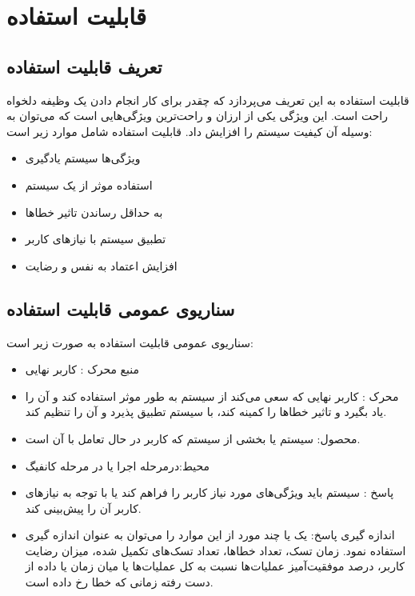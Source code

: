 \chapter{قابلیت استفاده}
\section{تعریف قابلیت استفاده}
قابلیت استفاده
به این تعریف می‌پردازد که چقدر برای کار انجام دادن یک وظیفه دلخواه راحت است. این ویژگی یکی از ارزان و راحت‌ترین ویژگی‌هایی است که می‌توان به وسیله آن کیفیت سیستم را افزایش داد. 
قابلیت استفاده شامل موارد زیر است:
\begin{itemize}
\item
ویژگی‌ها سیستم یادگیری
\item
استفاده موثر از یک سیستم 
\item
به حداقل رساندن تاثیر خطاها
\item
تطبیق سیستم با نیازهای کاربر
\item
افزایش اعتماد به نفس و رضایت
\end{itemize}


\section{سناریوی عمومی قابلیت استفاده}
سناریو‌ی عمومی قابلیت استفاده به صورت زیر است:
\begin{itemize}
\item
منبع محرک : کاربر نهایی
\item
محرک : کاربر نهایی که سعی می‌کند از سیستم به طور موثر استفاده کند و آن را یاد بگیرد و تاثیر خطاها را کمینه کند، با سیستم تطبیق پذیرد و آن را تنظیم کند.
\item
محصول: سیستم یا بخشی از سیستم که کاربر در حال تعامل با آن است.
\item
محیط:درمرحله اجرا یا در مرحله کانفیگ
\item
پاسخ : 
سیستم باید ویژگی‌های مورد نیاز کاربر را فراهم کند یا با توجه به نیازهای کاربر آن را پیش‌بینی کند.
\item
اندازه گیری پاسخ: یک یا چند مورد از این موارد را می‌توان به عنوان اندازه گیری استفاده نمود. زمان تسک، تعداد خطاها، تعداد تسک‌های تکمیل شده، میزان رضایت کاربر، درصد موفقیت‌آمیز عملیات‌ها نسبت به کل عملیات‌ها یا میان زمان یا داده از دست رفته زمانی که خطا رخ داده است.
\end{itemize}

